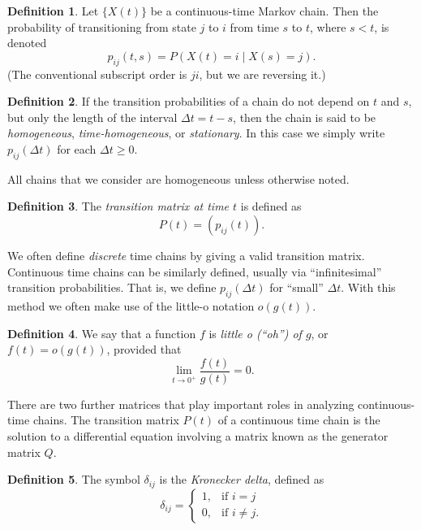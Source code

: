 \documentclass[12pt]{article}
\theoremstyle{definition}
\newtheorem{defn}{Definition}
\begin{document}
\begin{defn}
    \label{defn:transition-probs}
    Let $\{X(t)\}$ be a continuous-time Markov chain. Then the probability of
    transitioning from state $j$ to $i$ from time $s$ to $t$, where $s < t$, is
    denoted $$p_{ij}(t, s) = P(X(t) = i \mid X(s) = j).$$ (The conventional
    subscript order is $ji$, but we are reversing it.)
\end{defn}

\begin{defn}
    \label{defn:homogenous-chain}
    If the transition probabilities of a chain do not depend on $t$ and $s$,
    but only the length of the interval $\Delta t = t - s$, then the chain is
    said to be \emph{homogeneous}, \emph{time-homogeneous}, or
    \emph{stationary}. In this case we simply write $p_{ij}(\Delta t)$ for each
    $\Delta t \geq 0$.
\end{defn}

All chains that we consider are homogeneous unless otherwise noted.

\begin{defn}
    \label{defn:transition-matrix}
    The \emph{transition matrix at time $t$} is defined as $$P(t) =
    (p_{ij}(t)).$$
\end{defn}

We often define \emph{discrete} time chains by giving a valid transition
matrix. Continuous time chains can be similarly defined, usually via
``infinitesimal'' transition probabilities. That is, we define $p_{ij}(\Delta
t)$ for ``small'' $\Delta t$. With this method we often make use of the
little-o notation $o(g(t))$.

\begin{defn}
    \label{defn:order-notation}
    We say that a function $f$ is \emph{little o (``oh'') of $g$}, or $f(t) =
    o(g(t))$, provided that
    \[
        \lim_{t \to 0^+} \frac{f(t)}{g(t)} = 0.
    \]
\end{defn}

There are two further matrices that play important roles in analyzing
continuous-time chains. The transition matrix $P(t)$ of a continuous time chain
is the solution to a differential equation involving a matrix known as the
generator matrix $Q$.

\begin{defn}
    \label{defn:kronecker-delta}
    The symbol $\delta_{ij}$ is the \emph{Kronecker delta}, defined as
    \[
        \delta_{ij} =
        \begin{cases}
            1, & \text{if } i = j \\
            0, & \text{if } i \neq j.
        \end{cases}
    \]
\end{defn}
\end{document}
